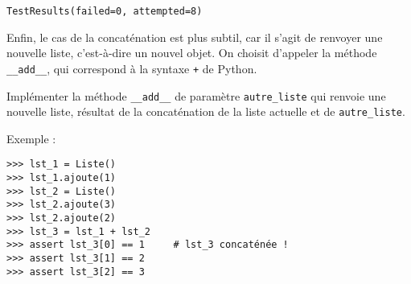 \documentclass[a4paper,17pt]{extarticle}
\makeatletter
\newcommand{\boxspacing}{\kern\kvtcb@left@rule\kern\kvtcb@boxsep}
\newcommand{\prompt}[4]{
        \ttfamily\llap{{\color{#2}[#3]:\hspace{3pt}#4}}\vspace{-\baselineskip}
    }
\makeatother
\begin{document}
            \begin{tcolorbox}[breakable, size=fbox, boxrule=.5pt, pad at break*=1mm, opacityfill=0]
\prompt{Out}{outcolor}{12}{\boxspacing}
\begin{Verbatim}[commandchars=\\\{\}]
TestResults(failed=0, attempted=8)
\end{Verbatim}
\end{tcolorbox}
        
    Enfin, le cas de la concaténation est plus subtil, car il s'agit de
renvoyer une nouvelle liste, c'est-à-dire un nouvel objet. On choisit
d'appeler la méthode \texttt{\_\_add\_\_}, qui correspond à la syntaxe
\texttt{+} de Python.

    Implémenter la méthode \texttt{\_\_add\_\_} de paramètre
\texttt{autre\_liste} qui renvoie une nouvelle liste, résultat de la
concaténation de la liste actuelle et de \texttt{autre\_liste}.

Exemple :

\begin{verbatim}
>>> lst_1 = Liste()
>>> lst_1.ajoute(1)
>>> lst_2 = Liste()
>>> lst_2.ajoute(3)
>>> lst_2.ajoute(2)
>>> lst_3 = lst_1 + lst_2
>>> assert lst_3[0] == 1     # lst_3 concaténée !
>>> assert lst_3[1] == 2
>>> assert lst_3[2] == 3
\end{verbatim}
\end{document}
